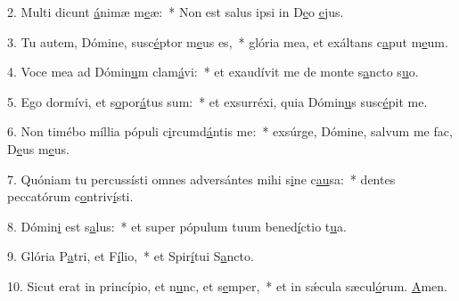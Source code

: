 2. Multi dicunt \uline{á}nimæ m\uline{e}æ:~* Non est salus ipsi in D\uline{e}o \uline{e}jus.\par 
3. Tu autem, Dómine, susc\uline{é}ptor m\uline{e}us es,~* glória mea, et exáltans c\uline{a}put m\uline{e}um.\par 
4. Voce mea ad Dómin\uline{u}m clam\uline{á}vi:~* et exaudívit me de monte s\uline{a}ncto s\uline{u}o.\par 
5. Ego dormívi, et s\uline{o}por\uline{á}tus sum:~* et exsurréxi, quia Dómin\uline{u}s susc\uline{é}pit me.\par 
6. Non timébo míllia pópuli c\uline{i}rcumd\uline{á}ntis me:~* exsúrge, Dómine, salvum me fac, D\uline{e}us m\uline{e}us.\par 
7. Quóniam tu percussísti omnes adversántes mihi s\uline{i}ne c\uline{au}sa:~* dentes peccatórum c\uline{o}ntriv\uline{í}sti.\par 
8. Dómin\uline{i} est s\uline{a}lus:~* et super pópulum tuum bened\uline{í}ctio t\uline{u}a.\par 
9. Glória P\uline{a}tri, et F\uline{í}lio,~* et Spir\uline{í}tui S\uline{a}ncto.\par 
10. Sicut erat in princípio, et n\uline{u}nc, et s\uline{e}mper,~* et in sǽcula sæcul\uline{ó}rum. \uline{A}men.\par 
